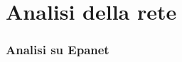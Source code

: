 \documentclass{beamer}
\begin{document}
\section{Analisi della rete}
\begin{frame}
 \frametitle{Analisi su Epanet}{\allowbreak}
 \begin{columns}
	 \begin{column}{.5\textwidth}
	  \begin{figure}
	   \centering
	   \begin{overprint}
	   \\
	   \onslide<2>\vspace{.5mm}

\end{overprint}
\end{figure}
\end{column}
\end{columns}
\end{frame}
\end{document}
